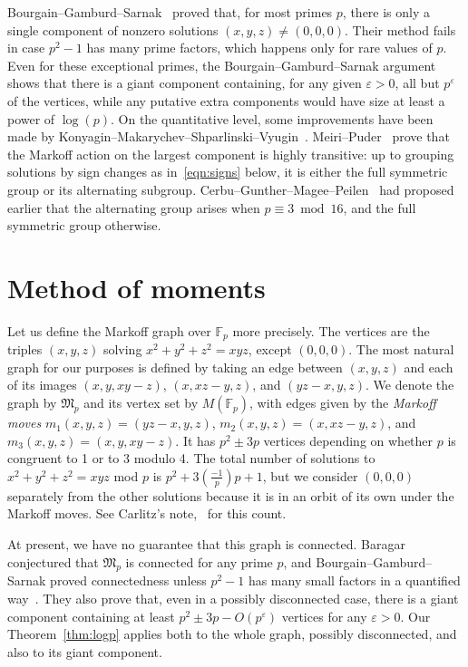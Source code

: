 \documentclass[AHL, Unicode, longabstracts, published]{cedram}
\newcommand{\F}{\mathbb{F}}
\begin{document}
Bourgain--Gamburd--Sarnak~\cite{BGS} proved that, for most primes $p$, there is only a single component of nonzero solutions $(x,y,z) \neq (0,0,0)$. Their method fails in case $p^2-1$ has many prime factors, which happens only for rare values of $p$. Even for these exceptional primes, the Bourgain--Gamburd--Sarnak argument shows that there is a giant component containing, for any given $\varepsilon > 0$, all but $p^{\varepsilon}$ of the vertices, while any putative extra components would have size at least a power of $\log(p)$. On the quantitative level, some improvements have been made by Konyagin--Makarychev--Shparlinski--Vyugin~\cite[Theorems~1.3 and 1.4]{KMSV}. Meiri--Puder~\cite{MPC} prove that the Markoff action on the largest component is highly transitive: up to grouping solutions by sign changes as in~\eqref{eqn:signs} below, it is either the full symmetric group or its alternating subgroup. Cerbu--Gunther--Magee--Peilen~\cite{CGMP} had proposed earlier that the alternating group arises when $p \equiv 3 \bmod 16$, and the full symmetric group otherwise.

\section{Method of moments}\label{sec:graph}

Let us define the Markoff graph over $\F_p$ more precisely. The vertices are the triples $(x,y,z)$ solving $x^2 + y^2 + z^2 = xyz$, except $(0,0,0)$. The most natural graph for our purposes is defined by taking an edge between $(x,y,z)$ and each of its images $(x,y,xy-z)$, $(x,xz-y,z)$, and $(yz-x,y,z)$. We denote the graph by $\mathfrak{M}_p$ and its vertex set by $M(\F_p)$, with edges given by the \emph{Markoff moves} $m_1(x,y,z) = (yz-x,y,z)$, $m_2(x,y,z) = (x,xz-y,z)$, and $m_3(x,y,z)=(x,y,xy-z)$. It has $p^2 \pm 3p$ vertices depending on whether $p$ is congruent to 1 or to 3 modulo 4. The total number of solutions to $x^2+y^2+z^2=xyz$ mod $p$ is $p^2 + 3(\tfrac{-1}{p})p + 1$, but we consider $(0,0,0)$ separately from the other solutions because it is in an orbit of its own under the Markoff moves. See Carlitz's note,~\cite[equation~(2)]{C} for this count.

At present, we have no guarantee that this graph is connected. Baragar~\cite{Bar} conjectured that $\mathfrak{M}_p$ is connected for any prime $p$, and Bourgain--Gamburd--Sarnak proved connectedness unless $p^2-1$ has many small factors in a quantified way~\cite{BGS}. They also prove that, even in a possibly disconnected case, there is a giant component containing at least $p^2 \pm 3p - O(p^{\varepsilon})$ vertices for any $\varepsilon > 0$. Our Theorem~\ref{thm:logp} applies both to the whole graph, possibly disconnected, and also to its giant component.
\end{document}
